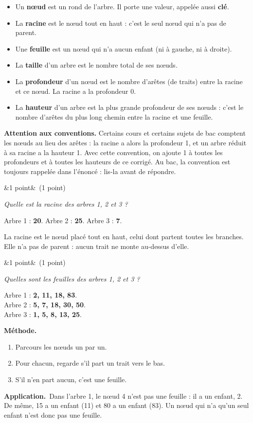 \documentclass[11pt, a4paper]{exam}
\newcommand{\Q}[3]{\par\needspace{5\baselineskip}\bigskip\noindent{\large\bfseries Question #1}\ifx&#2&\else\ \textnormal{(#2)}\fi\par\nopagebreak\smallskip\noindent\textit{#3}\par\nopagebreak\smallskip}
\newcommand{\methode}{\par\noindent\textbf{Méthode.}\ }
\newcommand{\application}{\par\noindent\textbf{Application.}\ }
\begin{document}
\begin{retenir}
\begin{itemize}
\item Un \textbf{nœud} est un rond de l'arbre. Il porte une valeur, appelée aussi \textbf{clé}.
\item La \textbf{racine} est le nœud tout en haut : c'est le seul nœud qui n'a pas de parent.
\item Une \textbf{feuille} est un nœud qui n'a aucun enfant (ni à gauche, ni à droite).
\item La \textbf{taille} d'un arbre est le nombre total de ses nœuds.
\item La \textbf{profondeur} d'un nœud est le nombre d'arêtes (de traits) entre la racine et ce nœud. La racine a la profondeur 0.
\item La \textbf{hauteur} d'un arbre est la plus grande profondeur de ses nœuds : c'est le nombre d'arêtes du plus long chemin entre la racine et une feuille.
\end{itemize}
\textbf{Attention aux conventions.} Certains cours et certains sujets de bac comptent les nœuds au lieu des arêtes : la racine a alors la profondeur 1, et un arbre réduit à sa racine a la hauteur 1. Avec cette convention, on ajoute 1 à toutes les profondeurs et à toutes les hauteurs de ce corrigé. Au bac, la convention est toujours rappelée dans l'énoncé : lis-la avant de répondre.
\end{retenir}

\Q{1}{1 point}{Quelle est la racine des arbres 1, 2 et 3 ?}
\begin{reponse}
Arbre 1 : \textbf{20}. \qquad Arbre 2 : \textbf{25}. \qquad Arbre 3 : \textbf{7}.
\end{reponse}
La racine est le nœud placé tout en haut, celui dont partent toutes les branches. Elle n'a pas de parent : aucun trait ne monte au-dessus d'elle.

\Q{2}{1 point}{Quelles sont les feuilles des arbres 1, 2 et 3 ?}
\begin{reponse}
Arbre 1 : \textbf{2, 11, 18, 83}. \\
Arbre 2 : \textbf{5, 7, 18, 30, 50}. \\
Arbre 3 : \textbf{1, 5, 8, 13, 25}.
\end{reponse}
\methode
\begin{enumerate}
\item Parcours les nœuds un par un.
\item Pour chacun, regarde s'il part un trait vers le bas.
\item S'il n'en part aucun, c'est une feuille.
\end{enumerate}
\application Dans l'arbre 1, le nœud 4 n'est pas une feuille : il a un enfant, 2. De même, 15 a un enfant (11) et 80 a un enfant (83). Un nœud qui n'a qu'un seul enfant n'est donc pas une feuille.
\end{document}
